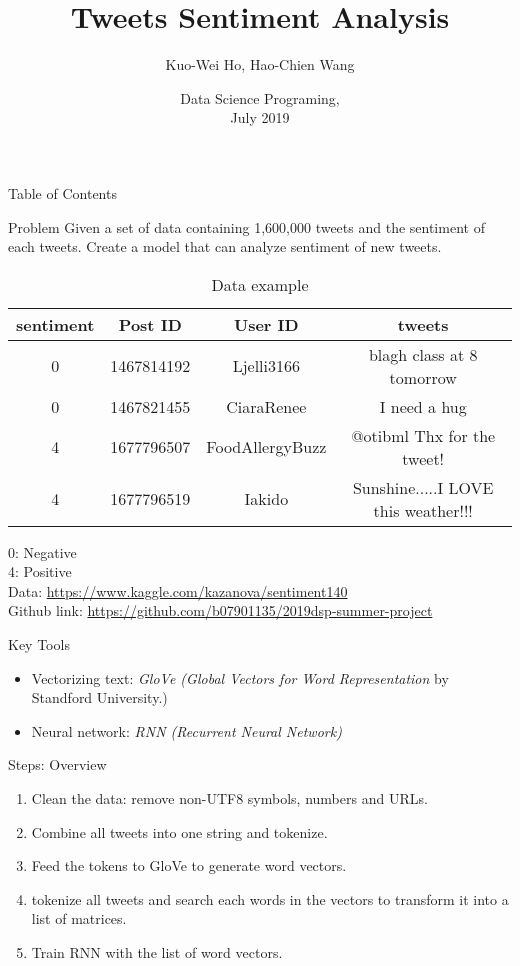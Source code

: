 \documentclass{beamer}
\title{Tweets Sentiment Analysis}
\author{Kuo-Wei Ho\inst{1}, Hao-Chien Wang\inst{2}}
\institute[NTU]
{
	\inst{1}
	NTUEE
	\and
	\inst{2}
	NTUPhys
}
\date[DSP 2019]
{Data Science Programing,\\July 2019}
\begin{document}
\frame{\titlepage}

\begin{frame}{Table of Contents}
	\tableofcontents[currentsection]
\end{frame}



\begin{frame}{Problem}
	Given a set of data containing 1,600,000 tweets and the sentiment of each tweets. Create a model that can analyze sentiment of new tweets.\\
	\begin{table}[htpb]
		\tiny
		\centering
		\caption{Data example}
		\label{tab:data}
		\begin{tabular}{c c c c}
			sentiment & Post ID & User ID & tweets \\
			\hline
			 0 & 1467814192 & Ljelli3166 & blagh class at 8 tomorrow  \\
			 0 & 1467821455 & CiaraRenee & I need a hug  \\
			 4 & 1677796507 & FoodAllergyBuzz & @otibml Thx for the tweet!  \\
			 4 & 1677796519 & Iakido & Sunshine.....I LOVE this weather!!!  \\
		\end{tabular}
	\end{table}
	0: Negative \\
	4: Positive \\
	{\scriptsize Data: \url{https://www.kaggle.com/kazanova/sentiment140}} \\
	{\scriptsize Github link: \url{https://github.com/b07901135/2019dsp-summer-project}}
\end{frame}

\begin{frame}{Key Tools}
	\begin{itemize}
		\item Vectorizing text: \textit{GloVe (Global Vectors for Word Representation} by Standford University.)
		\item Neural network: \textit{RNN (Recurrent Neural Network)}
	\end{itemize}
\end{frame}

\begin{frame}{Steps: Overview}
	\begin{enumerate}
		\item Clean the data: remove non-UTF8 symbols, numbers and URLs.
		\item Combine all tweets into one string and tokenize.
		\item Feed the tokens to GloVe to generate word vectors.
		\item tokenize all tweets and search each words in the vectors to transform it into a list of matrices.
		\item Train RNN with the list of word vectors.
	\end{enumerate}	
\end{frame}
\end{document}
